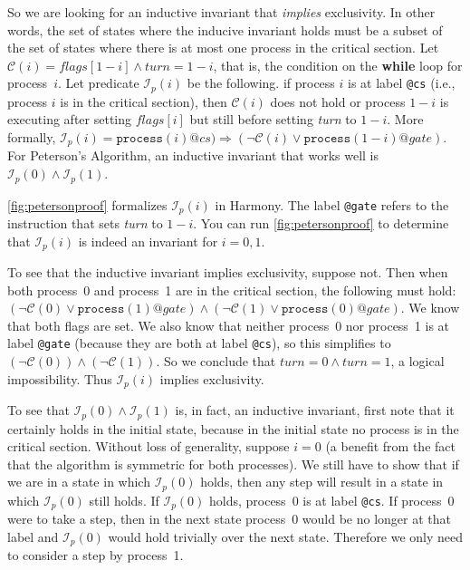 \documentclass{report}
\begin{document}
So we are looking for an inductive invariant that \emph{implies} exclusivity.
In other words, the set of states where the inducive invariant holds
must be a subset of the set of states where there is at most one process in
the critical section.
Let $\mathcal{C}(i) = \mathit{flags}[1 - i] \land
\mathit{turn} = 1 - i$, that is, the condition on the \textbf{while} loop
for process~$i$.
Let predicate $\mathcal{I}_p(i)$ be the following.
if process $i$ is at label \texttt{@cs} (i.e., process $i$ is in the critical section),
then $\mathcal{C}(i)$ does not hold or process $1-i$ is executing after setting
$\mathit{flags}[i]$ but still before setting \textit{turn} to $1-i$.
More formally, $\mathcal{I}_p(i) = \mathtt{process}(i)@cs) \Rightarrow (\lnot \mathcal{C}(i) \lor \mathtt{process}(1-i)@gate)$.
For Peterson's Algorithm, an inductive invariant that works well is
$\mathcal{I}_p(0) \land \mathcal{I}_p(1)$.

\autoref{fig:petersonproof} formalizes $\mathcal{I}_p(i)$ in Harmony.
The label \texttt{@gate} refers to the instruction that sets \textit{turn} to $1-i$.
You can run \autoref{fig:petersonproof} to determine
that $\mathcal{I}_p(i)$ is indeed an invariant for $i = 0, 1$.

To see that the inductive invariant implies exclusivity, suppose not.  Then
when both process~0 and process~1 are in the critical section, the
following must hold:
$(\lnot \mathcal{C}(0) \lor \mathtt{process}(1)@gate) \land
 (\lnot \mathcal{C}(1) \lor \mathtt{process}(0)@gate)$.
We know that both flags are set.
We also know that neither process~0 nor process~1 is at label \texttt{@gate}
(because they are both at label \texttt{@cs}),
so this simplifies to $(\lnot \mathcal{C}(0)) \land (\lnot \mathcal{C}(1))$.
So we conclude that $\mathit{turn} = 0 \land \mathit{turn} = 1$, a
logical impossibility.  Thus $\mathcal{I}_p(i)$ implies exclusivity.

To see that $\mathcal{I}_p(0) \land \mathcal{I}_p(1)$ is, in fact, an inductive invariant, first note that
it certainly holds in the initial state, because in the initial state no process
is in the critical section.
Without loss of generality, suppose $i=0$ (a benefit from the fact that the algorithm is
symmetric for both processes).  We still have to show that if we are in a state
in which $\mathcal{I}_p(0)$ holds, then any step will result in a state in which
$\mathcal{I}_p(0)$ still holds.
If $\mathcal{I}_p(0)$ holds, process~0 is at label \texttt{@cs}.  If process~0
were to take a step, then in the next state process~0 would be no longer
at that label and $\mathcal{I}_p(0)$ would hold trivially over the next state.
Therefore we only need to consider a step by process~1.
\end{document}
